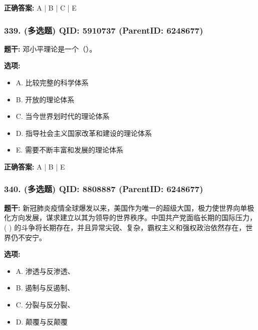 \documentclass[12pt,UTF8]{ctexart}
\begin{document}
\textbf{正确答案:}
A | B | C | E

\vspace{0.3em}\hrulefill\vspace{0.7em}

\subsubsection*{339. (多选题) \small QID: 5910737 (ParentID: 6248677)}

\textbf{题干:}
邓小平理论是一个（）。



\textbf{选项:}
\begin{itemize}[leftmargin=*]

  \item A. 比较完整的科学体系

  \item B. 开放的理论体系

  \item C. 当今世界划时代的理论体系

  \item D. 指导社会主义国家改革和建设的理论体系

  \item E. 需要不断丰富和发展的理论体系

\end{itemize}

\textbf{正确答案:}
A | B | E

\vspace{0.3em}\hrulefill\vspace{0.7em}

\subsubsection*{340. (多选题) \small QID: 8808887 (ParentID: 6248677)}

\textbf{题干:}
新冠肺炎疫情全球爆发以来，美国作为唯一的超级大国，极力使世界向单极化方向发展，谋求建立以其为领导的世界秩序。中国共产党面临长期的国际压力， ( ) 的斗争将长期存在，并且异常尖锐、复杂，霸权主义和强权政治依然存在，世界仍不安宁。



\textbf{选项:}
\begin{itemize}[leftmargin=*]

  \item A. 渗透与反渗透、

  \item B. 遏制与反遏制、

  \item C. 分裂与反分裂、

  \item D. 颠覆与反颠覆

\end{itemize}
\end{document}
